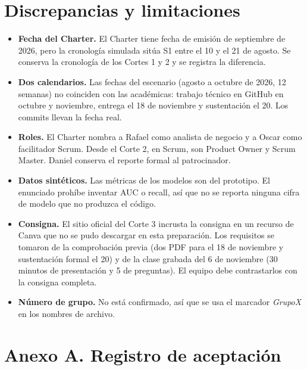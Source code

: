 \documentclass[10pt,a4paper]{article}
\begin{document}
\section{Discrepancias y limitaciones}
\begin{itemize}
\item \textbf{Fecha del Charter.} El Charter tiene fecha de emisión de septiembre de 2026, pero la cronología simulada sitúa S1 entre el 10 y el 21 de agosto. Se conserva la cronología de los Cortes 1 y 2 y se registra la diferencia.
\item \textbf{Dos calendarios.} Las fechas del escenario (agosto a octubre de 2026, 12 semanas) no coinciden con las académicas: trabajo técnico en GitHub en octubre y noviembre, entrega el 18 de noviembre y sustentación el 20. Los commits llevan la fecha real.
\item \textbf{Roles.} El Charter nombra a Rafael como analista de negocio y a Oscar como facilitador Scrum. Desde el Corte 2, en Scrum, son Product Owner y Scrum Master. Daniel conserva el reporte formal al patrocinador.
\item \textbf{Datos sintéticos.} Las métricas de los modelos son del prototipo. El enunciado prohíbe inventar AUC o recall, así que no se reporta ninguna cifra de modelo que no produzca el código.
\item \textbf{Consigna.} El sitio oficial del Corte 3 incrusta la consigna en un recurso de Canva que no se pudo descargar en esta preparación. Los requisitos se tomaron de la comprobación previa (dos PDF para el 18 de noviembre y sustentación formal el 20) y de la clase grabada del 6 de noviembre (30 minutos de presentación y 5 de preguntas). El equipo debe contrastarlos con la consigna completa.
\item \textbf{Número de grupo.} No está confirmado, así que se usa el marcador \emph{GrupoX} en los nombres de archivo.
\end{itemize}

\clearpage
\appendix
\section*{Anexo A. Registro de aceptación}

\end{document}
